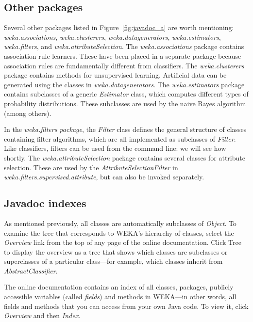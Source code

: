 \subsection{Other packages}

Several other packages listed in Figure~\ref{fig:javadoc_a} are worth mentioning:
\textit{weka.associations}, \textit{weka.clusterers}, \textit{weka.datagenerators},
\textit{weka.estimators}, \textit{weka.filters}, and \newline
\textit{weka.attributeSelection}. The
\textit{weka.associations} package contains association rule learners. These
have been placed in a separate package because association rules are
fundamentally different from classifiers. The \textit{weka.clusterers} package
contains methods for unsupervised learning. Artificial data can be
generated using the classes in \textit{weka.datagenerators}. The
\textit{weka.estimators} package contains subclasses of a generic \textit{Estimator}
class, which computes different types of probability
distributions. These subclasses are used by the naive Bayes algorithm
(among others).

In the \textit{weka.filters package}, the \textit{Filter} class
defines the general structure of classes containing filter algorithms,
which are all implemented as subclasses of \textit{Filter}. Like classifiers,
filters can be used from the command line: we will see how
shortly. The \textit{weka.attributeSelection} package contains several classes
for attribute selection. These are used by the
\textit{AttributeSelectionFilter} in \newline
\textit{weka.filters.supervised.attribute}, but can also be invoked separately.

\subsection{Javadoc indexes}

As mentioned previously, all classes are automatically subclasses of
\textit{Object}. To examine the tree that corresponds to WEKA's hierarchy of
classes, select the \textit{Overview} link from the top of any page of
the online documentation. Click Tree to display the overview as a tree
that shows which classes are subclasses or superclasses of a
particular class---for example, which classes inherit from
\textit{AbstractClassifier}.

The online documentation contains an index of all classes, packages,
publicly accessible variables (called \textit{fields}) and methods in
WEKA---in other words, all fields and methods that you can access from
your own Java code. To view it, click \textit{Overview} and
then \textit{Index}.

